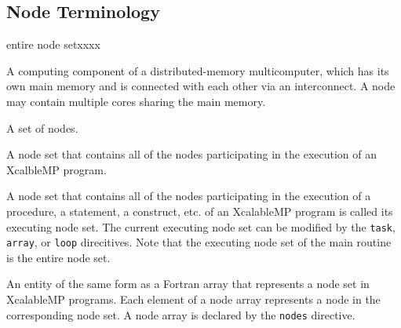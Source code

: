 \subsection{Node Terminology}

\begin{namelist}{entire node setxxxx}



 A computing component of a distributed-memory multicomputer, which has
 its own main memory and is connected with each other via an
 interconnect. A node may contain multiple cores sharing the main
 memory.



 A set of nodes.


 A node set that contains all of the nodes participating in the
 execution of an XcalbleMP program.


 A node set that contains all of the nodes participating in the
 execution of a procedure, a statement, a construct, etc. of an
 XcalableMP program is called its executing node set. The current
 executing node set can be modified by the {\tt task}, {\tt array}, or
 {\tt loop} direcitives. Note that the executing node set of the main
 routine is the entire node set.


 An entity of the same form as a Fortran array that represents a node
 set in XcalableMP programs. Each element of a node array represents a
 node in the corresponding node set. A node array is declared by the
 {\tt nodes} directive.


%


\end{namelist}
